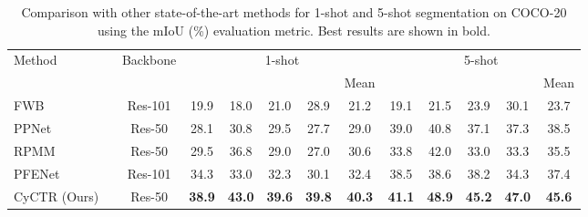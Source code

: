 \documentclass{article}
\begin{document}
\begin{table}[t]
\caption{Comparison with other state-of-the-art methods for 1-shot and 5-shot segmentation on COCO-20 using the mIoU (\%) evaluation metric. Best results are shown in bold.}
\label{tab:coco}
\small
\centering
\tabcolsep 0.08in\begin{tabular}{l|c|ccccc|ccccc}
\toprule[1pt]
\multirow{2}{*}{Method} & \multirow{2}{*}{Backbone} & \multicolumn{5}{c|}{1-shot} & \multicolumn{5}{c}{5-shot} \\ \cline{3-12} 
	&  &  &  &  &  & Mean &  &  &  &  & Mean \\
\hline
FWB~\cite{nguyen2019FWB} & Res-101 & 19.9 & 18.0 & 21.0 & 28.9 & 21.2 & 19.1 & 21.5 & 23.9 & 30.1 & 23.7\\
PPNet~\cite{liu2020ppnet} & Res-50& 28.1 & 30.8 & 29.5 & 27.7 & 29.0 & 39.0 & 40.8 & 37.1 & 37.3 & 38.5\\
RPMM \cite{yang2020PMM}  & Res-50 & 29.5 & 36.8 & 29.0 & 27.0 & 30.6 & 33.8 & 42.0 & 33.0 & 33.3 &  35.5\\
PFENet~\cite{tian2020pfenet} & Res-101  & 34.3 & 33.0 & 32.3 & 30.1 & 32.4 & 38.5 & 38.6 & 38.2 & 34.3 & 37.4 \\ 
\hline
CyCTR (Ours) \ & Res-50 & \textbf{38.9} & \textbf{43.0} & \textbf{39.6} &  \textbf{39.8} & \textbf{40.3} & \textbf{41.1} & \textbf{48.9} & \textbf{45.2} &  \textbf{47.0} & \textbf{45.6}   \\
\bottomrule[1pt]
\end{tabular}
\end{table}
\end{document}
